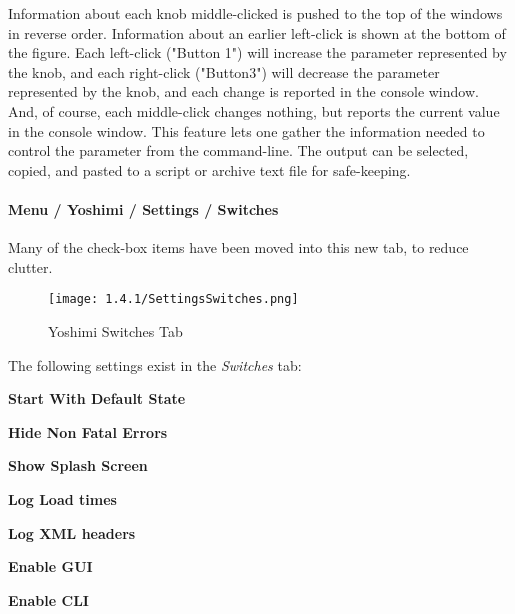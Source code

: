 

   Information about each knob middle-clicked is pushed to the top of the
   windows in reverse order.
   Information about an earlier left-click is shown at the bottom of the figure.
   Each left-click ("Button 1") will increase the parameter represented by the
   knob, and each right-click ("Button3") will decrease the parameter
   represented by the knob, and each change is reported in the console window.
   And, of course, each middle-click changes nothing, but reports the current
   value in the console window.
   This feature lets one gather the information needed to
   control the parameter from the command-line.
   The output can be selected, copied, and pasted to a script or archive text
   file for safe-keeping.


\paragraph{Menu / Yoshimi / Settings / Switches}
\label{paragraph:menu_yoshimi_settings_switches}

   Many of the check-box items have been moved into this new tab, to reduce
   clutter.

\begin{figure}[H]
   \centering 
   \texttt{[image: 1.4.1/SettingsSwitches.png]}
   \caption{Yoshimi Switches Tab}
   \label{fig:yoshimi_settings_switches_tab}
\end{figure}

   The following settings exist in the \textsl{Switches} tab:

   \begin{enumber}
      \item \textbf{Start With Default State}
      \item \textbf{Hide Non Fatal Errors}
      \item \textbf{Show Splash Screen}
      \item \textbf{Log Load times}
      \item \textbf{Log XML headers}
      \item \textbf{Enable GUI}
      \item \textbf{Enable CLI}
   \end{enumber}

